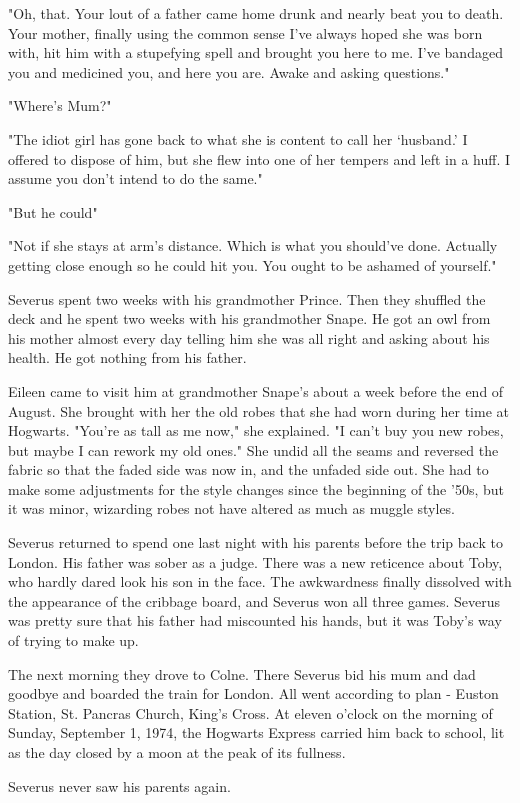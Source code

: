 "Oh, that. Your lout of a father came home drunk and nearly beat you to death. Your mother, finally using the common sense I've always hoped she was born with, hit him with a stupefying spell and brought you here to me. I've bandaged you and medicined you, and here you are. Awake and asking questions."

"Where's Mum?"

"The idiot girl has gone back to what she is content to call her `husband.' I offered to dispose of him, but she flew into one of her tempers and left in a huff. I assume you don't intend to do the same."

"But he could{\el}"

"Not if she stays at arm's distance. Which is what you should've done. Actually getting close enough so he could hit you. You ought to be ashamed of yourself."

Severus spent two weeks with his grandmother Prince. Then they shuffled the deck and he spent two weeks with his grandmother Snape. He got an owl from his mother almost every day telling him she was all right and asking about his health. He got nothing from his father.

Eileen came to visit him at grandmother Snape's about a week before the end of August. She brought with her the old robes that she had worn during her time at Hogwarts. "You're as tall as me now," she explained. "I can't buy you new robes, but maybe I can rework my old ones." She undid all the seams and reversed the fabric so that the faded side was now in, and the unfaded side out. She had to make some adjustments for the style changes since the beginning of the '50s, but it was minor, wizarding robes not have altered as much as muggle styles.

Severus returned to spend one last night with his parents before the trip back to London. His father was sober as a judge. There was a new reticence about Toby, who hardly dared look his son in the face. The awkwardness finally dissolved with the appearance of the cribbage board, and Severus won all three games. Severus was pretty sure that his father had miscounted his hands, but it was Toby's way of trying to make up.

The next morning they drove to Colne. There Severus bid his mum and dad goodbye and boarded the train for London. All went according to plan - Euston Station, St. Pancras Church, King's Cross. At eleven o'clock on the morning of Sunday, September 1, 1974, the Hogwarts Express carried him back to school, lit as the day closed by a moon at the peak of its fullness.

Severus never saw his parents again.


